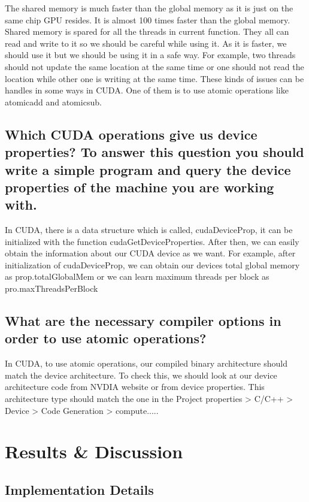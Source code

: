 \documentclass[a4paper,11pt]{article}
\theoremstyle{mytheor}
\begin{document}
The shared memory is much faster than the global memory as it is just on the same chip GPU resides. It is almost 100 times faster than the global memory. Shared memory is spared for all the threads in current function. They all can read and write to it so we should be careful while using it. As it is faster, we should use it but we should be using it in a safe way. For example, two threads should not update the same location at the same time or one should not read the location while other one is writing at the same time. These kinds of issues can be handles in some ways in CUDA. One of them is to use atomic operations like atomicadd and atomicsub.

\subsection{Which CUDA operations give us device properties? To answer this question you should
write a simple program and query the device properties of the machine you are working
with.}

In CUDA, there is a data structure which is called, cudaDeviceProp, it can be initialized with the function cudaGetDeviceProperties. After then, we can easily obtain the information about our CUDA device as we want. For example, after initialization of cudaDeviceProp, we can obtain our devices total global memory as prop.totalGlobalMem or we can learn maximum threads per block as pro.maxThreadsPerBlock

\subsection{What are the necessary compiler options in order to use atomic operations?}

In CUDA, to use atomic operations, our compiled binary architecture should match the device architecture. To check this, we should look at our device architecture code from NVDIA website or
from device properties. This architecture type should match the one in the Project properties > C/C++ > Device > Code Generation > compute.....

\section{Results \& Discussion}
\subsection{Implementation Details}
\end{document}
